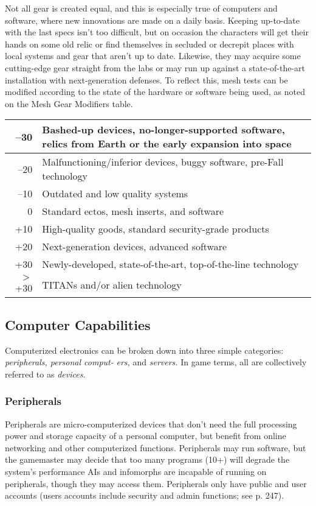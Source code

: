 Not all gear is created equal, and this is especially true 
of computers and software, where new innovations 
are made on a daily basis. Keeping up-to-date with 
the last specs isn't too difficult, but on occasion the 
characters will get their hands on some old relic or 
find themselves in secluded or decrepit places with 
local systems and gear that aren't up to date. Likewise, 
they may acquire some cutting-edge gear straight 
from the labs or may run up against a state-of-the-art 
installation with next-generation defenses. To reflect 
this, mesh tests can be modified according to the state 
of the hardware or software being used, as noted on 
the Mesh Gear Modifiers table.
\\
\begin{tabular}{|r|l|}
\hline
–30 & Bashed-up devices, no-longer-supported software, relics from Earth or the early expansion into space \\
\hline
–20 & Malfunctioning/inferior devices, buggy software, pre-Fall technology \\
\hline
–10 & Outdated and low quality systems \\
\hline
0 & Standard ectos, mesh inserts, and software \\
\hline
+10 & High-quality goods, standard security-grade products \\
\hline
+20 & Next-generation devices, advanced software \\
\hline
+30 & Newly-developed, state-of-the-art, top-of-the-line technology \\
\hline
$>$+30 & TITANs and/or alien technology \\
\hline
\end{tabular}

\subsection{Computer Capabilities}

Computerized electronics can be broken down into 
three simple categories: \textit{peripherals, personal comput-}
\textit{ers,  }and  \textit{servers.} In game terms, all are collectively 
referred to as \textit{devices.}

\subsubsection{Peripherals}

Peripherals are micro-computerized devices that don't 
need the full processing power and storage capacity of 
a personal computer, but benefit from online networking
and other computerized functions. Peripherals may
run software, but the gamemaster may decide that too 
many programs (10+) will degrade the system's performance
AIs and infomorphs are incapable of running
on peripherals, though they may access them. Peripherals
only have public and user accounts (users accounts
include security and admin functions; see p. 247).

